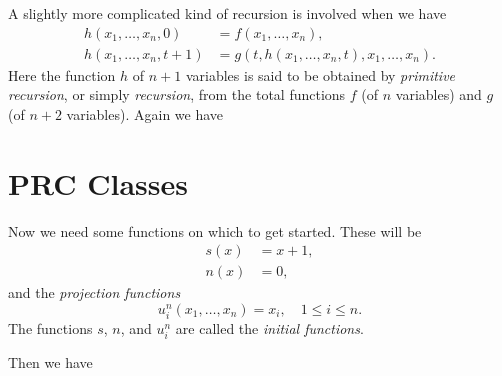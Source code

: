 \documentclass[a4paper,10pt,twoside]{book}
\begin{document}

A slightly more complicated kind of recursion is involved when we have
\begin{equation}
    \begin{aligned}h(x_1,\ldots,x_n,0)&=f(x_1,\ldots,x_n),\\h(x_1,\ldots,x_n,t+1)&=g(t,h(x_1,\ldots,x_n,t),x_1,\ldots,x_n).\end{aligned}
    \label{2.2}
\end{equation}
Here the function $h$ of $n+1$ variables is said to be obtained by \textit{primitive recursion}, or simply \textit{recursion}, from the total functions $f$ (of $n$ variables) and $g$ (of $n+2$ variables). Again we have


\section{PRC Classes}

Now we need some functions on which to get started. These will be $$\begin{aligned}s(x)&=x+1,\\n(x)&=0,\end{aligned}$$ and the \textit{projection functions} $$u_i^n(x_1,\ldots,x_n)=x_i,\quad1\le i\le n.$$ The functions $s$, $n$, and $u_i^n$ are called the \textit{initial functions}.


Then we have


\end{document}
